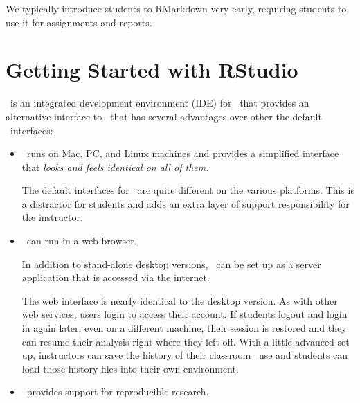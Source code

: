 \documentclass{tufte-book}\usepackage[]{graphicx}\usepackage[]{xcolor}
\begin{document}
We typically introduce students to RMarkdown very early, requiring students to use it for assignments and reports\cite{baum:2014}.





\chapter{Getting Started with RStudio}


\label{chap:RStudio}

\RStudio\ is an integrated development environment (IDE) for \R\ that provides an alternative
interface to \R\ that has several advantages over other the default \R\ interfaces:
\begin{itemize}
	\item \RStudio\ runs on Mac, PC, and Linux machines and provides 
	  a simplified interface that 
	  \emph{looks and feels identical on all of them.}

		The default interfaces for \R\ are quite different on the various platforms.  This
		is a distractor for students and adds an extra layer of support responsibility
		for the instructor.
	\item
		\RStudio\ can run in a web browser.

		In addition to stand-alone desktop versions, \RStudio\ can be set up 
		as a server application that is accessed via the internet.  

		The web interface is nearly identical to the desktop version.%
		As with other web services, users login to access their account.
		If students logout and login in again later, even on a different machine,
		their session is restored and they can resume their analysis 
		right where they left off.
		With a little advanced set up, instructors can save the history of their 
		classroom \R\ use and students can load those history files into their own
		environment.%
	\item
		\RStudio\ provides support for reproducible research.


\end{itemize}
\end{document}
